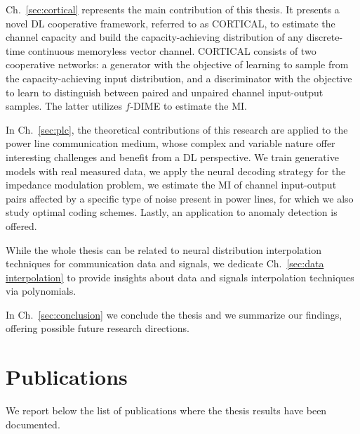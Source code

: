 Ch.~\ref{sec:cortical} represents the main contribution of this thesis. It presents a novel DL cooperative framework, referred to as CORTICAL, to estimate the channel capacity and build the capacity-achieving distribution of any discrete-time continuous memoryless vector channel. CORTICAL consists of two cooperative networks: a generator with the objective of learning to sample from the capacity-achieving input distribution, and a discriminator with the objective to learn to distinguish between paired and unpaired channel input-output samples. The latter utilizes $f$-DIME to estimate the MI. 

In Ch.~\ref{sec:plc}, the theoretical contributions of this research are applied to the power line communication medium, whose complex and variable nature offer interesting challenges and benefit from a DL perspective. We train generative models with real measured data, we apply the neural decoding strategy for the impedance modulation problem, we estimate the MI of channel input-output pairs affected by a specific type of noise present in power lines, for which we also study optimal coding schemes. Lastly, an application to anomaly detection is offered.

While the whole thesis can be related to neural distribution interpolation techniques for communication data and signals, we dedicate Ch.~\ref{sec:data interpolation} to provide insights about data and signals interpolation techniques via polynomials. 

In Ch.~\ref{sec:conclusion} we conclude the thesis and we summarize our findings, offering possible future research directions.

\section{Publications}
\label{sec:relatedpub}
We report below the list of publications where the thesis results have been documented. 

